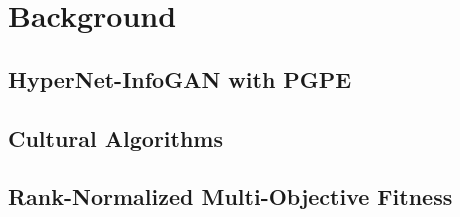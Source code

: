 \documentclass[letterpaper]{article} %
\begin{document}
\section{Background}

\subsection{HyperNet-InfoGAN with PGPE}

\subsection{Cultural Algorithms}

\subsection{Rank-Normalized Multi-Objective Fitness}
\end{document}
